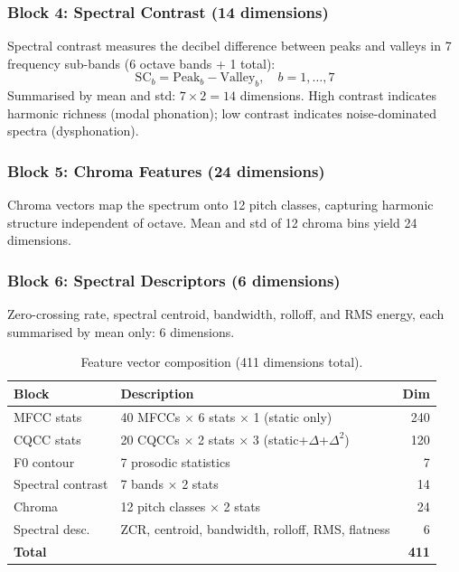 \documentclass[11pt,a4paper]{article}
\begin{document}
\subsubsection{Block 4: Spectral Contrast (14 dimensions)}

Spectral contrast measures the decibel difference between peaks and
valleys in 7 frequency sub-bands (6 octave bands + 1 total):
\begin{equation}
  \text{SC}_b = \text{Peak}_b - \text{Valley}_b, \quad b = 1, \dots, 7
\end{equation}
Summarised by mean and std: $7 \times 2 = 14$ dimensions. High contrast
indicates harmonic richness (modal phonation); low contrast indicates
noise-dominated spectra (dysphonation).

\subsubsection{Block 5: Chroma Features (24 dimensions)}

Chroma vectors map the spectrum onto 12 pitch classes, capturing
harmonic structure independent of octave. Mean and std of 12 chroma
bins yield 24 dimensions.

\subsubsection{Block 6: Spectral Descriptors (6 dimensions)}

Zero-crossing rate, spectral centroid, bandwidth, rolloff, and RMS
energy, each summarised by mean only: 6 dimensions.

\begin{table}[H]
\centering
\caption{Feature vector composition (411 dimensions total).}
\label{tab:features}
\begin{tabular}{llr}
\toprule
\textbf{Block} & \textbf{Description} & \textbf{Dim} \\
\midrule
MFCC stats       & 40 MFCCs $\times$ 6 stats $\times$ 1 (static only) & 240 \\
CQCC stats       & 20 CQCCs $\times$ 2 stats $\times$ 3 (static+$\Delta$+$\Delta^2$) & 120 \\
F0 contour       & 7 prosodic statistics & 7 \\
Spectral contrast & 7 bands $\times$ 2 stats & 14 \\
Chroma           & 12 pitch classes $\times$ 2 stats & 24 \\
Spectral desc.   & ZCR, centroid, bandwidth, rolloff, RMS, flatness & 6 \\
\midrule
\textbf{Total}   & & \textbf{411} \\
\bottomrule
\end{tabular}
\end{table}
\end{document}
